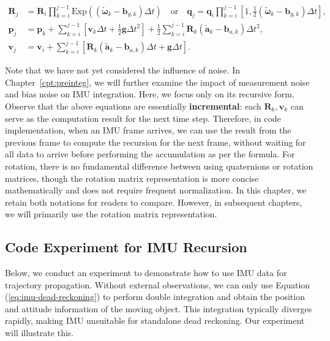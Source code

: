 \begin{subequations}\label{eq:imu-dead-reckoning}
	\begin{align}
		\mathbf{R}_j &= \mathbf{R}_i \prod_{k=i}^{j-1}\mathrm{Exp} \left(\left(\tilde{\boldsymbol{\omega}}_k - 
		\mathbf{b}_{g,k}\right) \Delta t\right) \quad \text{or}\quad \mathbf{q}_j = \mathbf{q}_i \prod_{k=i}^{j-1} \left[1, 
		\frac{1}{2} \left(\tilde{\boldsymbol{\omega}}_k - \mathbf{b}_{g,k}\right) \Delta t \right], \\
		\mathbf{p}_j &= \mathbf{p}_k + \sum_{k=i}^{j-1} \left[\mathbf{v}_k \Delta t + \frac{1}{2} \mathbf{g} \Delta t^2\right] + 
		\frac{1}{2} \sum_{k=i}^{j-1} \mathbf{R}_k \left(\tilde{\mathbf{a}}_k - \mathbf{b}_{a,k} \right) \Delta t^2, \\
		\mathbf{v}_j &= \mathbf{v}_i + \sum_{k=i}^{j-1}\left[ \mathbf{R}_k\left(\tilde{\mathbf{a}}_k - \mathbf{b}_{a,k} \right) 
		\Delta t+ \mathbf{g} \Delta t  \right].
	\end{align}
\end{subequations}

Note that we have not yet considered the influence of noise. In Chapter~\ref{cpt:preinteg}, we will further examine the impact of measurement noise and bias noise on IMU integration. Here, we focus only on its recursive form. Observe that the above equations are essentially \textbf{incremental}: each $\mathbf{R}_k, \mathbf{v}_k$ can serve as the computation result for the next time step. Therefore, in code implementation, when an IMU frame arrives, we can use the result from the previous frame to compute the recursion for the next frame, without waiting for all data to arrive before performing the accumulation as per the formula. For rotation, there is no fundamental difference between using quaternions or rotation matrices, though the rotation matrix representation is more concise mathematically and does not require frequent normalization. In this chapter, we retain both notations for readers to compare. However, in subsequent chapters, we will primarily use the rotation matrix representation.

\subsection{Code Experiment for IMU Recursion}
Below, we conduct an experiment to demonstrate how to use IMU data for trajectory propagation. Without external observations, we can only use Equation (\ref{eq:imu-dead-reckoning}) to perform double integration and obtain the position and attitude information of the moving object. This integration typically diverges rapidly, making IMU unsuitable for standalone dead reckoning. Our experiment will illustrate this.

